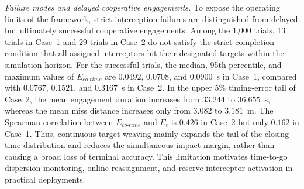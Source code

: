 
\emph{Failure modes and delayed cooperative engagements.}
To expose the operating limits of the framework, strict interception failures
are distinguished from delayed but ultimately successful cooperative
engagements. Among the 1,000 trials, 13 trials in Case~1 and 29 trials in
Case~2 do not satisfy the strict completion condition that all assigned
interceptors hit their designated targets within the simulation horizon. For
the successful trials, the median, 95th-percentile, and maximum values of
$E_{co\text{-}time}$ are $0.0492$, $0.0708$, and $0.0900$~s in Case~1,
compared with $0.0767$, $0.1521$, and $0.3167$~s in Case~2. In the upper 5\%
timing-error tail of Case~2, the mean engagement duration increases from
$33.244$ to $36.655$~s, whereas the mean miss distance increases only from
$3.082$ to $3.181$~m. The Spearman correlation between
$E_{co\text{-}time}$ and $E_t$ is $0.426$ in Case~2 but only $0.162$ in
Case~1. Thus, continuous target weaving mainly expands the tail of the
closing-time distribution and reduces the simultaneous-impact margin, rather
than causing a broad loss of terminal accuracy. This limitation motivates
time-to-go dispersion monitoring, online reassignment, and reserve-interceptor
activation in practical deployments.

